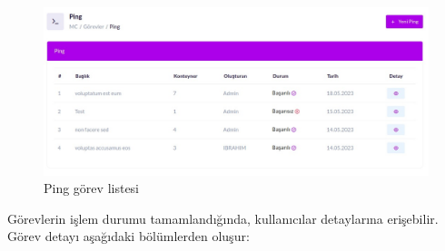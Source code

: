 \begin{figure}[ht]
	\centering
	\includegraphics[width=0.9\linewidth]{images/ping_list.jpeg}
	\caption{Ping görev listesi}
	\label{fig:ping_list}
\end{figure}

Görevlerin işlem durumu tamamlandığında, kullanıcılar detaylarına erişebilir. Görev detayı aşağıdaki bölümlerden oluşur:
